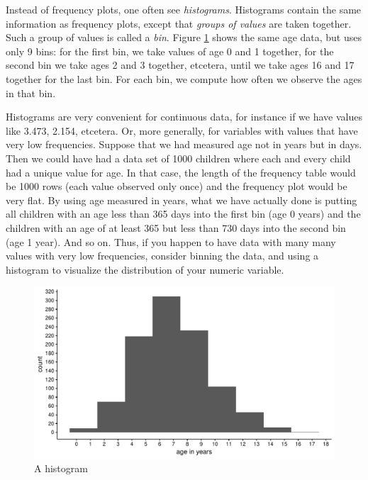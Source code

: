 \documentclass[]{book}\usepackage[]{graphicx}\usepackage[]{color}
\makeatletter
\def\maxwidth{ %
  \ifdim\Gin@nat@width>\linewidth
    \linewidth
  \else
    \Gin@nat@width
  \fi
}
\newenvironment{knitrout}{}{} %
\makeatother
\begin{document}
Instead of frequency plots, one often see \textit{histograms}. Histograms contain the same information as frequency plots, except that \textit{groups of values} are taken together. Such a group of values is called a \textit{bin}. Figure \ref{fig:distr_2} shows the same age data, but uses only 9 bins: for the first bin, we take values of age 0 and 1 together, for the second bin we take ages 2 and 3 together, etcetera, until we take ages 16 and 17 together for the last bin. For each bin, we compute how often we observe the ages in that bin.

Histograms are very convenient for continuous data, for instance if we have values like 3.473, 2.154, etcetera. Or, more generally, for variables with values that have very low frequencies. Suppose that we had measured age not in years but in days. Then we could have had a data set of 1000 children where each and every child had a unique value for age. In that case, the length of the frequency table would be 1000 rows (each value observed only once) and the frequency plot would be very flat. By using age measured in years, what we have actually done is putting all children with an age less than 365 days into the first bin (age 0 years) and the children with an age of at least 365 but less than 730 days into the second bin (age 1 year). And so on. Thus, if you happen to have data with many many values with very low frequencies, consider binning the data, and using a histogram to visualize the distribution of your numeric variable.



\begin{knitrout}
\color{fgcolor}\begin{figure}

{\centering \includegraphics[width=\maxwidth]{figure/distr_2-1} 

}

\caption[A histogram]{A histogram}\label{fig:distr_2}
\end{figure}


\end{knitrout}
\end{document}
